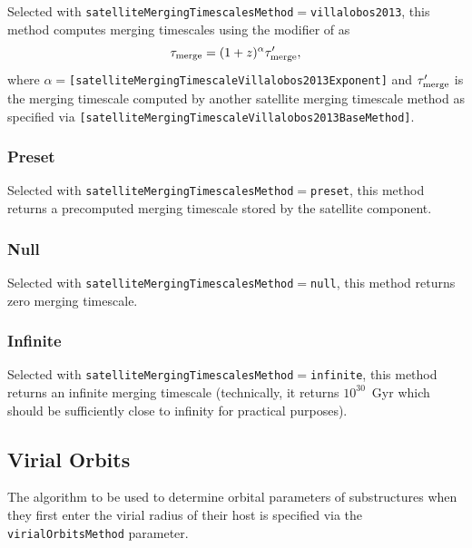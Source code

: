 Selected with {\tt satelliteMergingTimescalesMethod}$=${\tt villalobos2013}, this method computes merging timescales using the modifier of \cite{villalobos_improved_2013} as
\begin{equation}
\tau_{\rm merge} = (1+z)^\alpha \tau^\prime_{\rm merge},
\end{equation}
where $\alpha=${\tt [satelliteMergingTimescaleVillalobos2013Exponent]} and $\tau^\prime_{\rm merge}$ is the merging timescale computed by another satellite merging timescale method as specified via {\tt [satelliteMergingTimescaleVillalobos2013BaseMethod]}.

\subsubsection{Preset}\label{phys:satelliteMergingTimescales:satelliteMergingTimescalesPreset}

Selected with {\tt satelliteMergingTimescalesMethod}$=${\tt preset}, this method returns a precomputed merging timescale stored by the satellite component.

\subsubsection{Null}\label{phys:satelliteMergingTimescales:satelliteMergingTimescalesNull}

Selected with {\tt satelliteMergingTimescalesMethod}$=${\tt null}, this method returns zero merging timescale.

\subsubsection{Infinite}\label{phys:satelliteMergingTimescales:satelliteMergingTimescalesInfinite}

Selected with {\tt satelliteMergingTimescalesMethod}$=${\tt infinite}, this method returns an infinite merging timescale (technically, it returns $10^{30}$~Gyr which should be sufficiently close to infinity for practical purposes).

\subsection{Virial Orbits}

The algorithm to be used to determine orbital parameters of substructures when they first enter the virial radius of their host is specified via the {\tt virialOrbitsMethod} parameter.

